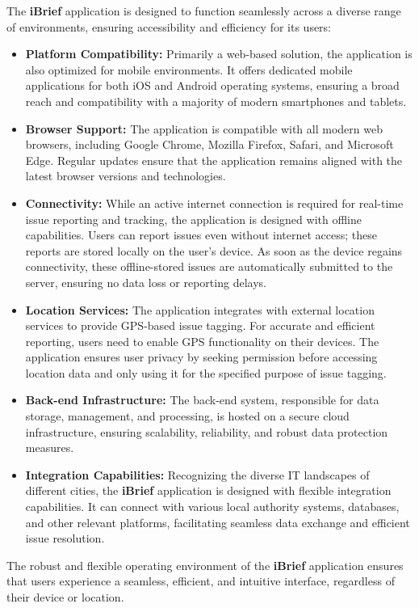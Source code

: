 The \textbf{iBrief} application is designed to function seamlessly across a diverse range of environments, ensuring accessibility and efficiency for its users:

\begin{itemize}
    \item \textbf{Platform Compatibility:} Primarily a \gls{web-based} solution, the application is also optimized for mobile environments. It offers dedicated mobile applications for both \gls{iOS} and \gls{Android} operating systems, ensuring a broad reach and compatibility with a majority of modern smartphones and tablets.

    \item \textbf{Browser Support:} The application is compatible with all modern web browsers, including Google Chrome, Mozilla Firefox, Safari, and Microsoft Edge. Regular updates ensure that the application remains aligned with the latest browser versions and technologies.

    \item \textbf{Connectivity:} While an active internet connection is required for real-time issue reporting and tracking, the application is designed with offline capabilities. Users can report issues even without internet access; these reports are stored locally on the user's device. As soon as the device regains connectivity, these offline-stored issues are automatically submitted to the server, ensuring no data loss or reporting delays.

    \item \textbf{Location Services:} The application integrates with external location services to provide GPS-based issue tagging. For accurate and efficient reporting, users need to enable GPS functionality on their devices. The application ensures user privacy by seeking permission before accessing location data and only using it for the specified purpose of issue tagging.

    \item \textbf{Back-end Infrastructure:} The \gls{back-end} system, responsible for data storage, management, and processing, is hosted on a secure cloud infrastructure, ensuring \gls{scalability}, reliability, and robust data protection measures.

    \item \textbf{Integration Capabilities:} Recognizing the diverse IT landscapes of different cities, the \textbf{iBrief} application is designed with flexible integration capabilities. It can connect with various local authority systems, databases, and other relevant platforms, facilitating seamless data exchange and efficient issue resolution.
\end{itemize}

The robust and flexible operating environment of the \textbf{iBrief} application ensures that users experience a seamless, efficient, and intuitive interface, regardless of their device or location.
